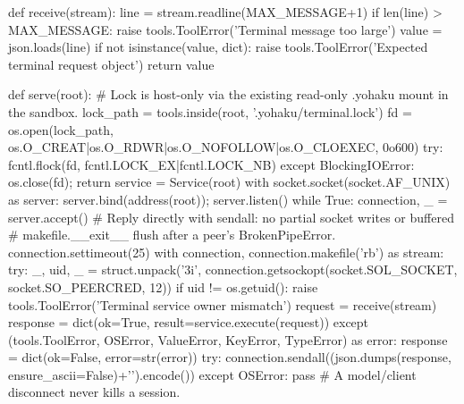 def receive(stream):
    line = stream.readline(MAX_MESSAGE+1)
    if len(line) > MAX_MESSAGE: raise tools.ToolError('Terminal message too large')
    value = json.loads(line)
    if not isinstance(value, dict): raise tools.ToolError('Expected terminal request object')
    return value


def serve(root):
    # Lock is host-only via the existing read-only .yohaku mount in the sandbox.
    lock_path = tools.inside(root, '.yohaku/terminal.lock')
    fd = os.open(lock_path, os.O_CREAT|os.O_RDWR|os.O_NOFOLLOW|os.O_CLOEXEC, 0o600)
    try: fcntl.flock(fd, fcntl.LOCK_EX|fcntl.LOCK_NB)
    except BlockingIOError: os.close(fd); return
    service = Service(root)
    with socket.socket(socket.AF_UNIX) as server:
        server.bind(address(root)); server.listen()
        while True:
            connection, _ = server.accept()
            # Reply directly with sendall: no partial socket writes or buffered
            # makefile.__exit__ flush after a peer's BrokenPipeError.
            connection.settimeout(25)
            with connection, connection.makefile('rb') as stream:
                try:
                    _, uid, _ = struct.unpack('3i', connection.getsockopt(socket.SOL_SOCKET, socket.SO_PEERCRED, 12))
                    if uid != os.getuid(): raise tools.ToolError('Terminal service owner mismatch')
                    request = receive(stream)
                    response = dict(ok=True, result=service.execute(request))
                except (tools.ToolError, OSError, ValueError, KeyError, TypeError) as error:
                    response = dict(ok=False, error=str(error))
                try: connection.sendall((json.dumps(response, ensure_ascii=False)+'\n').encode())
                except OSError: pass  # A model/client disconnect never kills a session.


